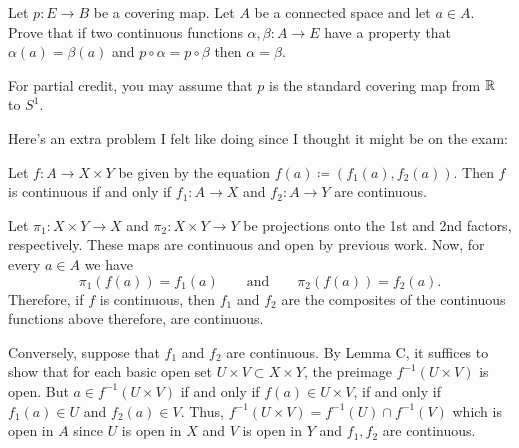 \begin{problem}
Let $p\colon E\to B$ be a covering map. Let $A$ be a connected space and
let $a\in A$. Prove that if two continuous functions $\alpha,\beta\colon
A\to E$ have a property that $\alpha(a)=\beta(a)$ and
$p\circ\alpha=p\circ\beta$ then $\alpha=\beta$.

For partial credit, you may assume that $p$ is the standard covering map
from $\mathbb{R}$ to $S^1$.
\end{problem}
\begin{solution}
\end{solution}

Here's an extra problem I felt like doing since I thought it might be on
the exam:
\begin{problem*}
\begin{theorem*}
Let $f\colon A\to X\times Y$ be given by the equation
$f(a)\coloneq(f_1(a),f_2(a))$. Then $f$ is continuous if and only if
$f_1\colon A\to X$ and $f_2\colon A\to Y$ are continuous.
\end{theorem*}
\end{problem*}
\begin{solution}
Let $\pi_1\colon X\times Y\to X$ and $\pi_2\colon X\times Y\to Y$ be
projections onto the 1st and 2nd factors, respectively. These maps are
continuous and open by previous work. Now, for every $a\in A$ we have
\[
\pi_1(f(a))=f_1(a)\qquad\text{and}\qquad
\pi_2(f(a))=f_2(a).
\]
Therefore, if $f$ is continuous, then $f_1$ and $f_2$ are the composites of
the continuous functions above therefore, are continuous.

Conversely, suppose that $f_1$ and $f_2$ are continuous. By Lemma C, it
suffices to show that for each basic open set $U\times V\subset X\times Y$,
the preimage $f^{-1}(U\times V)$ is open. But $a\in f^{-1}(U\times V)$ if
and only if $f(a)\in U\times V$, if and only if $f_1(a)\in U$ and
$f_2(a)\in V$. Thus, $f^{-1}(U\times V)=f^{-1}(U)\cap f^{-1}(V)$ which is
open in $A$ since $U$ is open in $X$ and $V$ is open in $Y$ and $f_1,f_2$
are continuous.
\end{solution}

